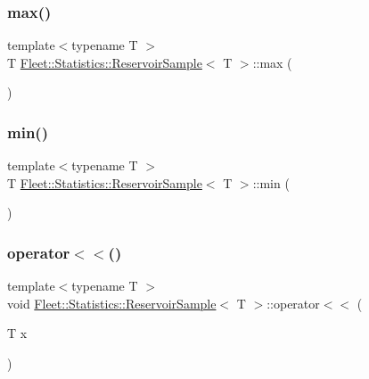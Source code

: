 \subsubsection{\texorpdfstring{max()}{max()}}
{\footnotesize\ttfamily template$<$typename T $>$ \\
T \hyperlink{class_fleet_1_1_statistics_1_1_reservoir_sample}{Fleet\+::\+Statistics\+::\+Reservoir\+Sample}$<$ T $>$\+::max (\begin{DoxyParamCaption}{ }\end{DoxyParamCaption})\hspace{0.3cm}{\ttfamily [inline]}}

\mbox{\label{class_fleet_1_1_statistics_1_1_reservoir_sample_ab2f186b828351e164e1ed6e60c8c9be8}} 
\subsubsection{\texorpdfstring{min()}{min()}}
{\footnotesize\ttfamily template$<$typename T $>$ \\
T \hyperlink{class_fleet_1_1_statistics_1_1_reservoir_sample}{Fleet\+::\+Statistics\+::\+Reservoir\+Sample}$<$ T $>$\+::min (\begin{DoxyParamCaption}{ }\end{DoxyParamCaption})\hspace{0.3cm}{\ttfamily [inline]}}

\mbox{\label{class_fleet_1_1_statistics_1_1_reservoir_sample_ad6e4d50ef1acefce7f5d66013720c1ef}} 
\subsubsection{\texorpdfstring{operator$<$$<$()}{operator<<()}}
{\footnotesize\ttfamily template$<$typename T $>$ \\
void \hyperlink{class_fleet_1_1_statistics_1_1_reservoir_sample}{Fleet\+::\+Statistics\+::\+Reservoir\+Sample}$<$ T $>$\+::operator$<$$<$ (\begin{DoxyParamCaption}\item[{T}]{x }\end{DoxyParamCaption})\hspace{0.3cm}{\ttfamily [inline]}}


